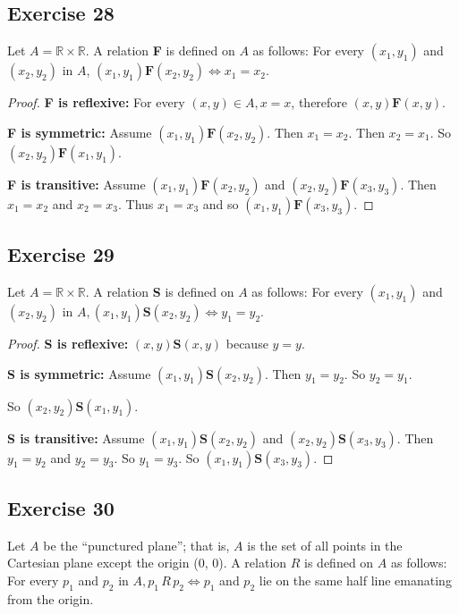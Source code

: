 \documentclass[14pt]{extarticle}
\newcommand{\R}{\mathbb{R}}
\begin{document}
\subsection{Exercise 28}
Let \(A = \R \times \R\). A relation {\bf F} is defined on \(A\) as follows: For every \((x_1, y_1)\) and \((x_2, y_2)
\) in $A$, \((x_1, y_1) \textbf{F} (x_2, y_2) \iff x_1 = x_2\).

\begin{proof}
{\bf F is reflexive:} For every \((x, y) \in A, x = x\), therefore \((x, y) \textbf{F} (x, y)\).

{\bf F is symmetric:} Assume \((x_1, y_1) \textbf{F} (x_2, y_2)\). Then \(x_1 = x_2\). Then \(x_2 = x_1\). So
\((x_2, y_2) \textbf{F} (x_1, y_1)\).

{\bf F is transitive:} Assume \((x_1, y_1) \textbf{F} (x_2, y_2)\) and \((x_2, y_2) \textbf{F} (x_3, y_3)\). Then
\(x_1 = x_2\) and \(x_2 = x_3\). Thus \(x_1 = x_3\) and so \((x_1, y_1) \textbf{F} (x_3, y_3)\).
\end{proof}

\subsection{Exercise 29}
Let \(A = \R \times \R\). A relation {\bf S} is defined on \(A\) as follows: For every \((x_1, y_1)\) and \((x_2, y_2)
\) in \(A, (x_1, y_1) \textbf{S} (x_2, y_2) \iff y_1 = y_2\).

\begin{proof}
{\bf S is reflexive:} \((x, y) \textbf{S} (x, y)\) because \(y = y\).

{\bf S is symmetric:} Assume \((x_1, y_1) \textbf{S} (x_2, y_2)\). Then \(y_1 = y_2\). So \(y_2 = y_1\). 

So \((x_2, y_2) \textbf{S} (x_1, y_1)\).

{\bf S is transitive:} Assume \((x_1, y_1) \textbf{S} (x_2, y_2)\) and \((x_2, y_2) \textbf{S} (x_3, y_3)\). Then
\(y_1 = y_2\) and \(y_2 = y_3\). So \(y_1 = y_3\). So \((x_1, y_1) \textbf{S} (x_3, y_3)\).
\end{proof}

\subsection{Exercise 30}
Let \(A\) be the “punctured plane”; that is, \(A\) is the set of all points in the Cartesian plane except the origin 
(0, 0). A relation \(R\) is defined on \(A\) as follows: For every \(p_1\) and \(p_2\) in \(A, p_1 \, R \, p_2 \iff 
p_1\) and \(p_2\) lie on the same half line emanating from the origin.
\end{document}
